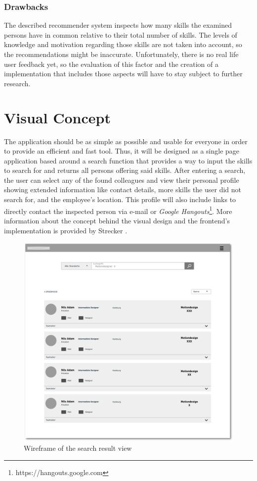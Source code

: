 \newpage

\subsubsection{Drawbacks}
The described recommender system inspects how many skills the examined persons have in common relative to their total number of skills. The levels of knowledge and motivation regarding those skills are not taken into account, so the recommendations might be inaccurate. Unfortunately, there is no real life user feedback yet, so the evaluation of this factor and the creation of a implementation that includes those aspects will have to stay subject to further research.

\section{Visual Concept}
The application should be as simple as possible and usable for everyone in order to provide an efficient and fast tool. Thus, it will be designed as a single page application based around a search function that provides a way to input the skills to search for and returns all persons offering said skills. After entering a search, the user can select any of the found colleagues and view their personal profile showing extended information like contact details, more skills the user did not search for, and the employee's location. This profile will also include links to directly contact the inspected person via e-mail or \textit{Google Hangouts}\footnote{https://hangouts.google.com}. More information about the concept behind the visual design and the frontend's implementation is provided by Strecker \cite{strecker}.

\begin{figure}[p]
    \centering
    \includegraphics[width=\textwidth]{images/wireframe.png}
    \caption[Illustration: Search Result Page (Wireframe)]{Wireframe of the search result view}
    \label{fig:wireframe}
\end{figure}

